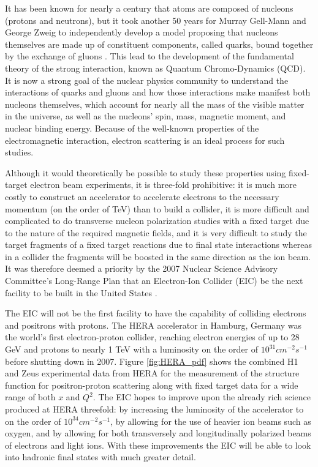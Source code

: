 \label{ch:eic}
It has been known for nearly a century that atoms are composed of nucleons (protons and neutrons), but it took another 50 years for Murray Gell-Mann and George Zweig to independently develop a model proposing that nucleons themselves are made up of constituent components, called quarks, bound together by the exchange of gluons \cite{SLACquark}. This lead to the development of the fundamental theory of the strong interaction, known as Quantum Chromo-Dynamics (QCD). It is now a strong goal of the nuclear physics community to understand the interactions of quarks and gluons and how those interactions make manifest both nucleons themselves, which account for nearly all the mass of the visible matter in the universe, as well as the nucleons' spin, mass, magnetic moment, and nuclear binding energy. Because of the well-known properties of the electromagnetic interaction, electron scattering is an ideal process for such studies. 

Although it would theoretically be possible to study these properties using fixed-target electron beam experiments, it is three-fold prohibitive: it is much more costly to construct an accelerator to accelerate electrons to the necessary momentum (on the order of TeV) than to build a collider, it is more difficult and complicated to do transverse nucleon polarization studies with a fixed target due to the nature of the required magnetic fields, and it is very difficult to study the target fragments of a fixed target reactions due to final state interactions whereas in a collider the fragments will be boosted in the same direction as the ion beam. It was therefore deemed a priority by the 2007 Nuclear Science Advisory Committee's Long-Range Plan that an Electron-Ion Collider (EIC) be the next facility to be built in the United States \cite{NSAC2007}.

The EIC will not be the first facility to have the capability of colliding electrons and positrons with protons. The HERA accelerator in Hamburg, Germany was the world's first electron-proton collider, reaching electron energies of up to 28 GeV and protons to nearly 1 TeV with a luminosity on the order of $10^{31}\unit{cm}^{-2}\unit{s}^{-1}$ before shutting down in 2007. Figure \ref{fig:HERA_pdf} shows the combined H1 and Zeus experimental data from HERA for the measurement of the structure function for positron-proton scattering along with fixed target data for a wide range of both $x$ and $Q^2$. The EIC hopes to improve upon the already rich science produced at HERA threefold: by increasing the luminosity of the accelerator to on the order of $10^{34}\unit{cm}^{-2}\unit{s}^{-1}$, by allowing for the use of heavier ion beams such as oxygen, and by allowing for both transversely and longitudinally polarized beams of electrons and light ions. With these improvements the EIC will be able to look into hadronic final states with much greater detail.

